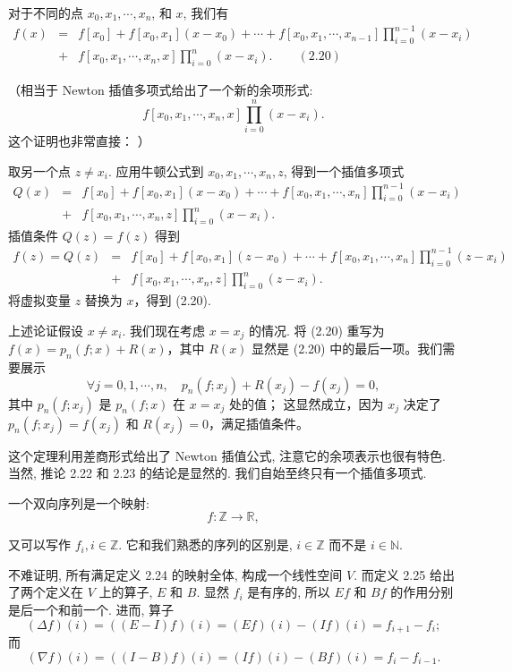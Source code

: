 \documentclass[a4paper]{ctexart}
\begin{document}
 对于不同的点 $x_0 , x_1 , \cdots , x_n$, 和 $x$, 我们有
\begin{eqnarray*}
  f (x) &=& f [x_0 ] + f [x_0 , x_1 ](x - x_0 ) + \cdots + f [x_0, x_1, \cdots , x_{n-1} ] \prod_{i=0}^{n-1} (x - x_i ) \\
  &+& f [x_0, x_1, \cdots , x_n , x] \prod_{i=0}^{n} (x - x_i ). \qquad \mathrm{(2.20)}
\end{eqnarray*}

（相当于 Newton 插值多项式给出了一个新的余项形式:
\[
  f [x_0, x_1, \cdots , x_n , x] \prod_{i=0}^{n} (x - x_i ).
\]
这个证明也非常直接：
）

 取另一个点 $z \neq x_i$. 
应用牛顿公式到 $x_0 , x_1 , \cdots , x_n , z$, 得到一个插值多项式
\begin{eqnarray*}
Q(x) &=& f [x_0] + f [x_0 , x_1](x - x_0) + \cdots + f [x_0 , x_1 , \cdots , x_n] 
\prod_{i=0}^{n-1} (x - x_i )\\
&+& f [x_0 , x_1 , \cdots , x_n , z] \prod_{i=0}^{n} (x - x_i ).
\end{eqnarray*}
插值条件 $Q(z) = f(z)$ 得到
\begin{eqnarray*}
f(z) = Q(z) &=& f [x_0 ] + f [x_0 , x_1 ](z - x_0) + \cdots + f [x_0 , x_1 , \cdots , x_n ] 
\prod_{i=0}^{n-1} (z - x_i )\\
&+& f [x_0 , x_1 , \cdots , x_n , z] \prod_{i=0}^{n} (z - x_i ).
\end{eqnarray*}
将虚拟变量 $z$ 替换为 $x$，得到 (2.20).

上述论证假设 $x \neq x_i$. 我们现在考虑 $x = x_j$ 的情况. 将 (2.20) 重写为 
$f(x) = p_n(f; x) + R(x)$，其中 $R(x)$ 显然是 (2.20) 中的最后一项。我们需要展示
\[
\forall j = 0, 1, \cdots , n, \quad p_n(f ; x_j ) + R(x_j ) - f (x_j ) = 0,
\]
其中 $p_n (f ; x_j )$ 是 $p_n(f ; x)$ 在 $x = x_j$ 处的值；
这显然成立，因为 $x_j$ 决定了 $p_n(f ; x_j ) = f (x_j )$ 和 $R(x_j ) = 0$，满足插值条件。

这个定理利用差商形式给出了 Newton 插值公式, 注意它的余项表示也很有特色. 
当然, 推论 2.22 和 2.23 的结论是显然的. 我们自始至终只有一个插值多项式. 

 一个双向序列是一个映射: 
$$
f : \mathbb{Z} \to \mathbb{R},
$$

又可以写作 $f_i, i \in \mathbb{Z}$. 它和我们熟悉的序列的区别是, $i \in
\mathbb{Z}$ 而不是 $i \in \mathbb{N}$.

不难证明, 所有满足定义 2.24 的映射全体, 构成一个线性空间 $V$. 而定义
2.25 给出了两个定义在 $V$ 上的算子, $E$ 和 $B$. 显然 $f_i$ 是有序的,
所以 $Ef$ 和 $Bf$ 的作用分别是后一个和前一个. 进而, 算子
$$
(\Delta f)(i) = ((E - I) f)(i) = (E f)(i) - (I f)(i) = f_{i + 1} - f_i;
$$
而
$$
(\nabla f)(i) = ((I - B) f)(i) = (I f)(i) - (B f)(i) = f_i - f_{i - 1}.
$$
\end{document}
